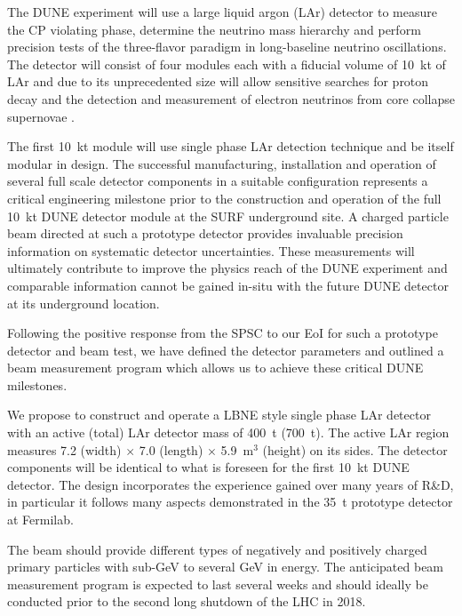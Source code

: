 \vspace{0.5cm}
The DUNE experiment will use a large liquid argon (LAr) detector to measure the CP violating phase, determine the neutrino mass hierarchy and perform precision tests of the three-flavor paradigm in long-baseline neutrino oscillations. The detector will consist of four modules 
each with a fiducial volume of 10~kt of LAr and due to its unprecedented size will allow sensitive searches for proton decay and the detection and measurement of electron neutrinos from core collapse supernovae \cite{dunecdr}.

The first 10~kt module will use single phase LAr detection technique and be itself modular in design. The successful manufacturing, installation and operation of several full scale detector components in a suitable configuration represents a critical engineering milestone prior to the construction and operation of the full 10~kt DUNE detector module at the SURF underground site. A charged particle beam directed at such
a prototype detector provides invaluable precision information on systematic detector uncertainties. These measurements will ultimately
contribute to improve the physics reach of the DUNE experiment and comparable information cannot be gained in-situ with the future DUNE detector at its underground location.

Following the positive response from the SPSC to our EoI \cite{eoi} for such a prototype detector and beam test, we have defined the detector parameters and outlined a beam measurement program which allows us to achieve these critical DUNE milestones.

We propose to construct and operate a LBNE style single phase LAr detector with an active (total) LAr detector mass of 400~t (700~t). 
The active LAr region measures 7.2 (width) $\times$ 7.0 (length) $\times$ 5.9~m$^3$ (height) on its sides.
The detector components will be identical to what is foreseen for the first 10~kt DUNE detector. The design incorporates the
experience gained over many years of R\&D, in particular it follows many aspects demonstrated in the 35~t prototype detector at Fermilab.

The beam should provide different types of negatively and positively charged primary particles with 
sub-GeV to several GeV in energy.
The anticipated beam measurement program
is expected to last several weeks and should ideally be conducted prior to the second 
long shutdown of the LHC in 2018. 

